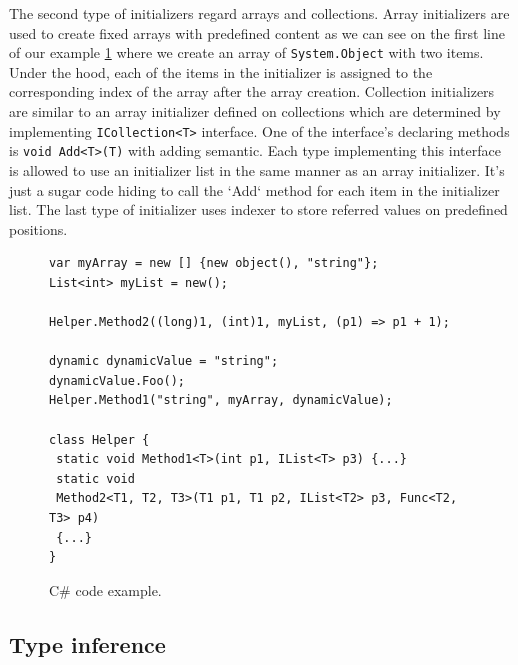 The second type of initializers regard arrays and collections.
Array initializers are used to create fixed arrays with predefined content as we can see on the first line of our example \ref{img55:typeConst} where we create an array of \texttt{System.Object} with two items.
Under the hood, each of the items in the initializer is assigned to the corresponding index of the array after the array creation.
Collection initializers are similar to an array initializer defined on collections which are determined by implementing \texttt{ICollection<T>} interface.
One of the interface's declaring methods is \texttt{void Add<T>(T)} with adding semantic.
Each type implementing this interface is allowed to use an initializer list in the same manner as an array initializer.
It's just a sugar code hiding to call the `Add` method for each item in the initializer list.
The last type of initializer uses indexer to store referred values on predefined positions.
\par
\begin{figure}
\begin{lstlisting}[style=csharpN]
var myArray = new [] {new object(), "string"};
List<int> myList = new();

Helper.Method2((long)1, (int)1, myList, (p1) => p1 + 1);

dynamic dynamicValue = "string";
dynamicValue.Foo();
Helper.Method1("string", myArray, dynamicValue);

class Helper {
 static void Method1<T>(int p1, IList<T> p3) {...}
 static void
 Method2<T1, T2, T3>(T1 p1, T1 p2, IList<T2> p3, Func<T2, T3> p4)
 {...}
}
\end{lstlisting}
\caption{C\# code example.}
\label{img55:typeConst}
\end{figure}

\subsection{Type inference}

